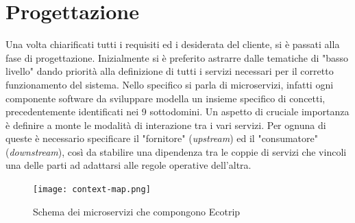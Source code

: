 
\section{Progettazione}
Una volta chiarificati tutti i requisiti ed i desiderata del cliente, si è passati alla fase di progettazione. Inizialmente si è preferito astrarre dalle tematiche di "basso livello" dando priorità alla definizione di tutti i servizi necessari per il corretto funzionamento del sistema. Nello specifico si parla di microservizi, infatti ogni componente software da sviluppare modella un insieme specifico di concetti, precedentemente identificati nei 9 sottodomini. Un aspetto di cruciale importanza è definire a monte le modalità di interazione tra i vari servizi. Per ognuna di queste è necessario specificare il "fornitore" (\textit{upstream}) ed il "consumatore" (\textit{downstream}), così da stabilire una dipendenza tra le coppie di servizi che vincoli una delle parti ad adattarsi alle regole operative dell'altra.

\begin{figure}[H]
    \texttt{[image: context-map.png]}
    \centering
    \caption[contextmap]{Schema dei microservizi che compongono Ecotrip}
    \label{fig:contextmap}
\end{figure}


